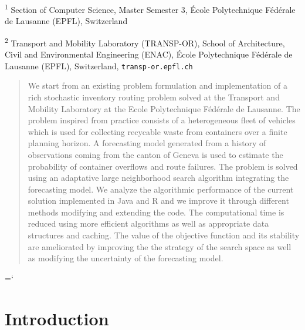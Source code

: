 \documentclass[12pt,a4paper]{article}
\begin{document}
\vfill
\hrulefill

\small \textsuperscript{1} Section of Computer Science, Master Semester 3, \'Ecole Polytechnique F\'ed\'erale de Lausanne (EPFL), Switzerland

\small \textsuperscript{2} Transport and Mobility Laboratory (TRANSP-OR), School of Architecture, Civil and Environmental Engineering (ENAC), \'Ecole Polytechnique F\'ed\'erale de Lausanne (EPFL), Switzerland, \verb+transp-or.epfl.ch+ 




\newpage


\begin{abstract}
We start from an existing problem formulation and implementation of a rich stochastic inventory routing problem solved at the Transport and Mobility Laboratory at the Ecole Polytechnique Fédérale de Lausanne. The problem inspired from practice consists of a heterogeneous fleet of vehicles which is used for collecting recycable waste from containers over a finite planning horizon. A forecasting model generated from a history of observations coming from the canton of Geneva is used to estimate the probability of container overflows and route failures. The problem is solved using an adaptative large neighborhood search algorithm integrating the forecasting model. We analyze the algorithmic performance of the current solution implemented in Java and R and we improve it through different methods modifying and extending the code. The computational time is reduced using more efficient algorithms as well as appropriate data structures and caching. The value of the objective function and its stability are ameliorated by improving the the strategy of the search space as well as modifying the uncertainty of the forecasting model. 
\end{abstract}

\newpage
{\ttfamily \hyphenchar\the\font=`\-}%
\section{Introduction}
\end{document}
